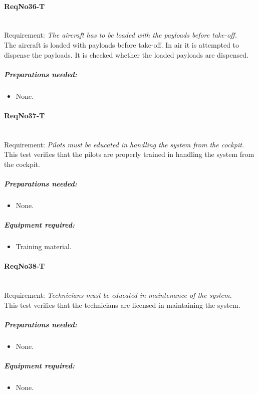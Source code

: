\paragraph{ReqNo36-T}\mbox{}\\ %
Requirement: \textit{The aircraft has to be loaded with the payloads before take-off.}
\\
The aircraft is loaded with payloads before take-off. In air it is attempted to dispense the payloads. It is checked whether the loaded payloads are dispensed.
\\
	\subparagraph{Preparations needed:}
	\begin{itemize}
	\item None.
	\end{itemize} 

\paragraph{ReqNo37-T}\mbox{}\\ %
Requirement: \textit{Pilots must be educated in handling the system from the cockpit.}
\\
This test verifies that the pilots are properly trained in handling the system from the cockpit.
\\
	\subparagraph{Preparations needed:}
	\begin{itemize}
	\item None.
	\end{itemize}

	\subparagraph{Equipment required:}
	\begin{itemize}
	\item Training material.
	\end{itemize}

\paragraph{ReqNo38-T}\mbox{}\\ %
Requirement: \textit{Technicians must be educated in maintenance of the system.}\\
This test verifies that the technicians are licensed in maintaining the system.
	\subparagraph{Preparations needed:}
	\begin{itemize}
	\item None.
	\end{itemize}

	\subparagraph{Equipment required:}
	\begin{itemize}
	\item None.
	\end{itemize}
	
